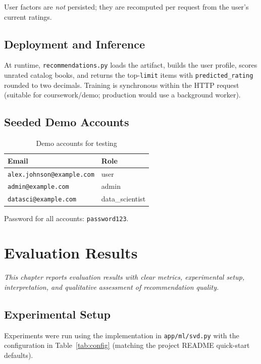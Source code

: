 \documentclass[12pt,a4paper]{report}
\newcommand{\chapterdesc}[1]{%
    \vspace{-0.6\baselineskip}
    \noindent\hspace*{1.5cm}\parbox{\dimexpr\textwidth-1.5cm\relax}{\textit{#1}}
    \par\vspace{0.3\baselineskip}
}
\begin{document}
User factors are \emph{not} persisted; they are recomputed per request from the user's current ratings.

\section{Deployment and Inference}

At runtime, \texttt{recommendations.py} loads the artifact, builds the user profile, scores unrated catalog books, and returns the top-\texttt{limit} items with \texttt{predicted\_rating} rounded to two decimals. Training is synchronous within the HTTP request (suitable for coursework/demo; production would use a background worker).

\section{Seeded Demo Accounts}

\begin{table}[htbp]
\centering
\caption{Demo accounts for testing}
\label{tab:demo-accounts}
\begin{tabular}{@{}ll@{}}
\toprule
\textbf{Email} & \textbf{Role} \\
\midrule
\texttt{alex.johnson@example.com} & user \\
\texttt{admin@example.com} & admin \\
\texttt{datasci@example.com} & data\_scientist \\
\bottomrule
\end{tabular}
\end{table}

Password for all accounts: \texttt{password123}.

\chapter{Evaluation Results}
\chapterdesc{This chapter reports evaluation results with clear metrics, experimental setup, interpretation, and qualitative assessment of recommendation quality.}

\section{Experimental Setup}

Experiments were run using the implementation in \texttt{app/ml/svd.py} with the configuration in Table~\ref{tab:config} (matching the project README quick-start defaults).
\end{document}

